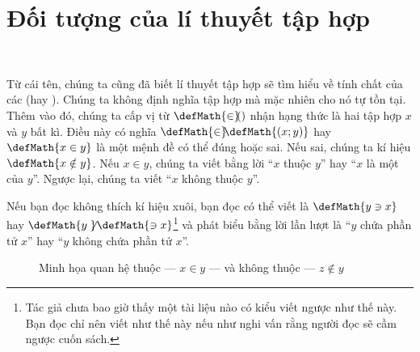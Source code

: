 \section{Đối tượng của lí thuyết tập hợp}

\

Từ cái tên, chúng ta cũng đã biết lí thuyết tập hợp sẽ tìm hiểu về tính chất của các  (hay ). Chúng ta không định nghĩa tập hợp mà mặc nhiên cho nó tự tồn tại. Thêm vào đó, chúng ta cấp vị từ $\defMath{\in}\hspace{-0.25em}()$ nhận hạng thức là hai tập hợp $x$ và $y$ bất kì. Điều này có nghĩa $\defMath{\in}\hspace{-0.25em}\defMath{(x; y)}$ hay $\defMath{x \in y}$ là một mệnh đề có thể đúng hoặc sai. Nếu sai, chúng ta kí hiệu $\defMath{x \notin y}$. Nếu $x \in y$, chúng ta viết bằng lời ``$x$ thuộc $y$'' hay ``$x$ là một  của $y$''. Ngược lại, chúng ta viết ``$x$ không thuộc $y$''.

Nếu bạn đọc không thích kí hiệu xuôi, bạn đọc có thể viết là $\defMath{y \ni x}$ hay $\defMath{y \not}\hspace{0.05em}\defMath{\ni x}$\footnote{Tác giả chưa bao giờ thấy một tài liệu nào có kiểu viết ngược như thế này. Bạn đọc chỉ nên viết như thế này nếu như nghi vấn rằng người đọc sẽ cầm ngược cuốn sách.} và phát biểu bằng lời lần lượt là ``$y$ chứa phần tử $x$'' hay ``$y$ không chứa phần tử $x$''.

\begin{figure}[H]
    \centering
    \caption{Minh họa quan hệ thuộc --- $x \in y$ --- và không thuộc --- $z \notin y$}
\end{figure}